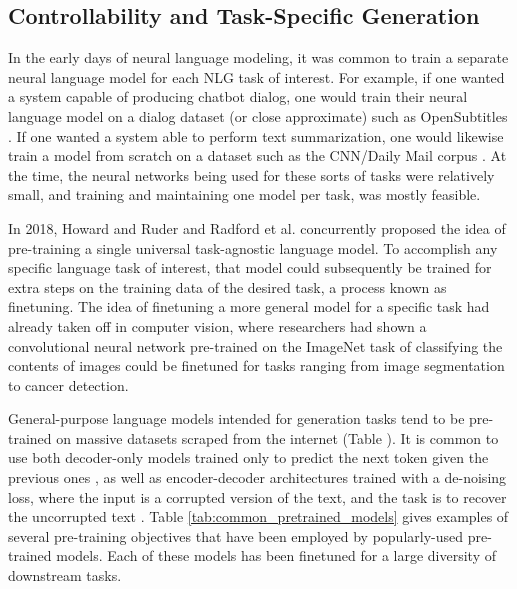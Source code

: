 \begin{itemize}
\section{Controllability and Task-Specific Generation}

In the early days of neural language modeling, it was common to train a separate neural language model for each NLG task of interest.
For example, if one wanted a system capable of producing chatbot dialog, one would train their neural language model on a dialog dataset (or close approximate) such as OpenSubtitles \citep{vinyals2015neural}.
If one wanted a system able to perform text summarization, one would likewise train a model from scratch on a dataset such as the CNN/Daily Mail corpus \cite{nallapati2016abstractive,DBLP:journals/corr/SeeLM17}.
At the time, the neural networks being used for these sorts of tasks were relatively small, and training and maintaining one model per task, was mostly feasible.

In 2018, Howard and Ruder \citep{howard2018universal} and Radford et al. \citep{radford2018improving} concurrently proposed the idea of pre-training a single universal task-agnostic language model.
To accomplish any specific language task of interest, that model could subsequently be trained for extra steps on the training data of the desired task, a process known as finetuning.
The idea of finetuning a more general model for a specific task had already taken off in computer vision, where researchers had shown a convolutional neural network pre-trained on the ImageNet task of classifying the contents of images could be finetuned for tasks ranging from image segmentation to cancer detection.

General-purpose language models intended for generation tasks tend to be pre-trained on massive datasets scraped from the internet (Table \label{tab:dataset_list}).
It is common to use both decoder-only models trained only to predict the next token given the previous ones \citep{radford2019language}, as well as encoder-decoder architectures trained with a de-noising loss, where the input is a corrupted version of the text, and the task is to recover the uncorrupted text \citep{raffel2019exploring,lewis2020bart}.
Table \ref{tab:common_pretrained_models} gives examples of several pre-training objectives that have been employed by popularly-used pre-trained models.
Each of these models has been finetuned for a large diversity of downstream tasks.


\end{itemize}
